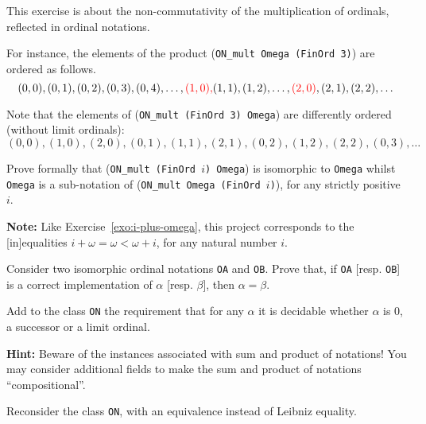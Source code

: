 \label{exo:ON-mult}
\begin{project}

This exercise is about the non-commutativity of the multiplication of ordinals, reflected in ordinal notations.

For instance, the
elements of the product (\texttt{ON\_mult Omega (FinOrd 3)}) are ordered as follows.
\[(0,0),(0,1),(0,2),(0,3),(0,4),\dots,{\color{red}(1,0),} (1,1),(1,2),\dots, {\color{red}(2,0)},(2,1),(2,2),\dots\]

Note that the elements of  (\texttt{ON\_mult (FinOrd 3) Omega}) are differently ordered (without limit ordinals):
\[(0,0),(1,0),(2,0),(0,1),(1,1),(2,1),(0,2),(1,2),(2,2),(0,3),\dots\]


Prove formally  that (\texttt{ON\_mult (FinOrd $i$) Omega}) is isomorphic to
\texttt{Omega}  whilst
\texttt{Omega}  is a sub-notation of (\texttt{ON\_mult Omega (FinOrd $i$)}),
for any strictly positive $i$. 

\textbf{Note:} Like Exercise~\ref{exo:i-plus-omega}, this project corresponds to the [in]equalities $i+\omega=\omega<\omega+i$, for any natural number $i$.
\end{project}

\begin{project}
Consider two isomorphic ordinal notations \texttt{OA} and \texttt{OB}.
Prove that, if \texttt{OA} [resp. \texttt{OB}] is a correct implementation 
of $\alpha$ [resp. $\beta$], then $\alpha=\beta$.
\end{project}


\begin{project}
\label{project:succ-limit-dec}
Add to the class \texttt{ON} the requirement that for any $\alpha$ it is decidable whether $\alpha$ is $0$, a successor or a limit ordinal.


\textbf{Hint:}   Beware of the instances associated with sum and product of notations!
  You may consider additional fields 
to make the sum and product of notations ``compositional''.

\end{project}

\begin{project}
\label{project:on-setoid}
Reconsider the  class \texttt{ON}, with an equivalence instead of Leibniz equality.
\end{project}





